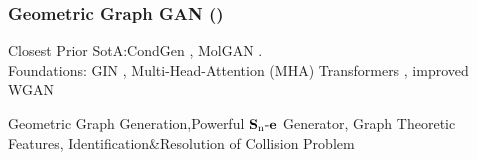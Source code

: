 \documentclass[./presentation.tex]{subfiles}
\begin{document}
\begin{frame}[t,label=gggfin]
  \frametitle{Geometric Graph GAN (\cite{krawczukGGGANGeometricGraph2020})}
  \vspace{-1cm}
  \small
  \begin{priorart}
  Closest Prior SotA:CondGen \citep{yangConditionalStructureGeneration2019e}, MolGAN \citep{decaoMolGANImplicitGenerative2022b}.\\
   Foundations: GIN \citep{xuHowPowerfulAre2019e}, Multi-Head-Attention (MHA) Transformers \citep{vaswaniAttentionAllYou2017c}, improved WGAN \citep{gulrajaniImprovedTrainingWasserstein2017d}
  \end{priorart}
  \begin{contributions}
    Geometric Graph Generation,Powerful $\operatorname{\mathbf{S}_n\mathbf{-e}}$ Generator, Graph Theoretic Features, Identification\&Resolution of Collision Problem
  \end{contributions}
  \begin{columns}
  \end{columns}
  
\end{frame}
\end{document}
